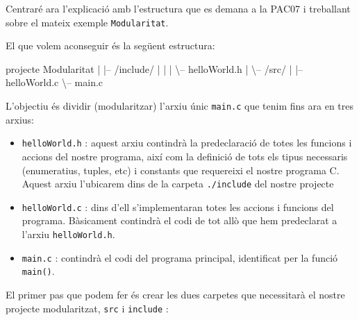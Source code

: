 \documentclass[]{book}
\newenvironment{Shaded}{\begin{snugshade}}{\end{snugshade}}
\newcommand{\NormalTok}[1]{#1}
\providecommand{\tightlist}{%
  \setlength{\itemsep}{0pt}\setlength{\parskip}{0pt}}
\begin{document}
Centraré ara l'explicació amb l'estructura que es demana a la PAC07 i
treballant sobre el mateix exemple \texttt{Modularitat}.

El que volem aconseguir és la següent estructura:

\begin{Shaded}
\begin{Highlighting}[]
\NormalTok{projecte Modularitat}
\NormalTok{   |}
\NormalTok{   |-- /include/}
\NormalTok{   |     |}
\NormalTok{   |     \textbackslash{}-- helloWorld.h}
\NormalTok{   |}
\NormalTok{   \textbackslash{}-- /src/}
\NormalTok{         |}
\NormalTok{         |-- helloWorld.c}
\NormalTok{         \textbackslash{}-- main.c}
\end{Highlighting}
\end{Shaded}

L'objectiu és dividir (modularitzar) l'arxiu únic \texttt{main.c} que
tenim fins ara en tres arxius:

\begin{itemize}
\tightlist
\item
  \texttt{helloWorld.h} : aquest arxiu contindrà la predeclaració de
  totes les funcions i accions del nostre programa, així com la
  definició de tots els tipus necessaris (enumeratius, tuples, etc) i
  constants que requereixi el nostre programa C. Aquest arxiu l'ubicarem
  dins de la carpeta \texttt{./include} del nostre projecte
\item
  \texttt{helloWorld.c} : dins d'ell s'implementaran totes les accions i
  funcions del programa. Bàsicament contindrà el codi de tot allò que
  hem predeclarat a l'arxiu \texttt{helloWorld.h}.
\item
  \texttt{main.c} : contindrà el codi del programa principal,
  identificat per la funció \texttt{main()}.
\end{itemize}

El primer pas que podem fer és crear les dues carpetes que necessitarà
el nostre projecte modularitzat, \texttt{src} i \texttt{include} :
\end{document}
